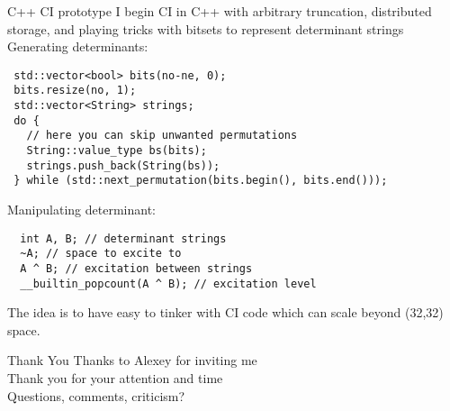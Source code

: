 \documentclass{beamer}
\begin{document}
\begin{frame}[fragile]{ C++ CI prototype}
  I begin CI in C++ with arbitrary truncation, distributed storage,
  and playing tricks with bitsets to represent determinant strings
\\
Generating determinants:
\begin{lstlisting}
 std::vector<bool> bits(no-ne, 0);
 bits.resize(no, 1);
 std::vector<String> strings;
 do {
   // here you can skip unwanted permutations
   String::value_type bs(bits);
   strings.push_back(String(bs));
 } while (std::next_permutation(bits.begin(), bits.end()));
\end{lstlisting}

Manipulating determinant:
\begin{lstlisting}
  int A, B; // determinant strings
  ~A; // space to excite to
  A ^ B; // excitation between strings
  __builtin_popcount(A ^ B); // excitation level
\end{lstlisting}

The idea is to have easy to tinker with CI code which can scale beyond
(32,32) space.
\end{frame}

 
\begin{frame}{Thank You}
  Thanks to Alexey for inviting me \\
  Thank you for your attention and time \\
  Questions, comments, criticism?
\end{frame}
\end{document}
